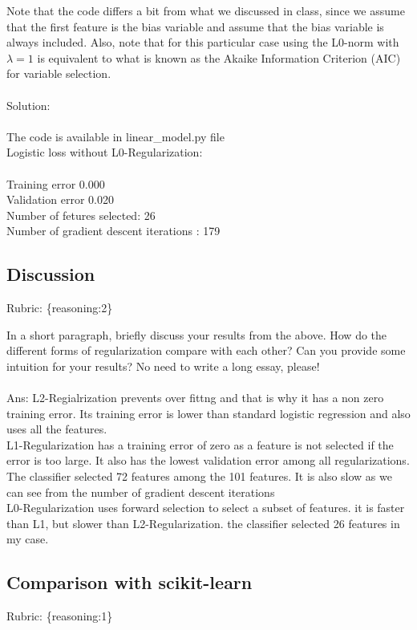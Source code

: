 \documentclass{article}
\def\rubric#1{\gre{Rubric: \{#1\}}}{}
\def\blu#1{{\color{blu}#1}}
\def\gre#1{{\color{gre}#1}}
\begin{document}
Note that the code differs a bit from what we discussed in class,
since we assume that the first feature is the bias variable and assume that the
bias variable is always included. Also, note that for this particular case using
the L0-norm with $\lambda=1$ is equivalent to what is known as the Akaike
Information Criterion (AIC) for variable selection. \\ \\
\blu{Solution: \\ \\
The code is available in linear\_model.py file  \\
Logistic loss without L0-Regularization: \\ \\
Training error 0.000 \\
Validation error 0.020 \\
Number of fetures selected: 26 \\
Number of gradient descent iterations : 179 \\
}

\subsection{Discussion}
\rubric{reasoning:2}

In a short paragraph, briefly discuss your results from the above. How do the
different forms of regularization compare with each other?
Can you provide some intuition for your results? No need to write a long essay, please! \\ \\
\blu { Ans:
L2-Regialrization prevents over fittng and that is why it has a non zero training error. Its training error is lower than standard logistic regression and also uses all the features. \\
L1-Regularization has a training error of zero as a feature is not selected if the error is too large. It also has the lowest validation error among all regularizations. The classifier selected 72 features among the 101 features. It is also slow as we can see from the number of gradient descent iterations \\
L0-Regularization uses forward selection to select a subset of features. it is faster than L1, but slower than L2-Regularization. the classifier selected 26 features in my case.
}


\subsection{Comparison with scikit-learn}
\rubric{reasoning:1}
\end{document}
